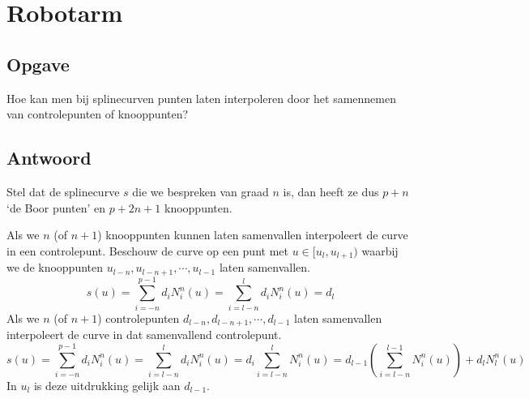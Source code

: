 \documentclass[examenvragen.tex]{subfiles}
\begin{document}
\section{Robotarm}
\subsection{Opgave}
Hoe kan men bij splinecurven punten laten interpoleren door het samennemen van controlepunten of knooppunten?

\subsection{Antwoord}
Stel dat de splinecurve $s$ die we bespreken van graad $n$ is, dan heeft ze dus $p+n$ `de Boor punten' en $p+2n+1$ knooppunten.

Als we $n$ (of $n+1$) knooppunten kunnen laten samenvallen interpoleert de curve in een controlepunt. Beschouw de curve op een punt met $u \in [u_l,u_{l+1})$ waarbij we de knooppunten $u_{l-n},u_{l-n+1},\cdots, u_{l-1}$ laten samenvallen.
\[
s(u)
= \sum_{i=-n}^{p-1}d_iN_{i}^{n}(u)
= \sum_{i=l-n}^{l}d_iN_{i}^{n}(u)
= d_l
\]
Als we $n$ (of $n+1$) controlepunten $d_{l-n},d_{l-n+1},\cdots, d_{l-1}$ laten samenvallen interpoleert de curve in dat samenvallend controlepunt.
\[
s(u)
= \sum_{i=-n}^{p-1}d_iN_{i}^{n}(u)
= \sum_{i=l-n}^{l}d_iN_{i}^{n}(u)
= d_i\sum_{i=l-n}^{l}N_{i}^{n}(u)
= d_{l-1}\left(\sum_{i=l-n}^{l-1}N_{i}^{n}(u)\right) + d_{l}N_{l}^{n}(u)
\]
In $u_l$ is deze uitdrukking gelijk aan $d_{l-1}$.
\end{document}
